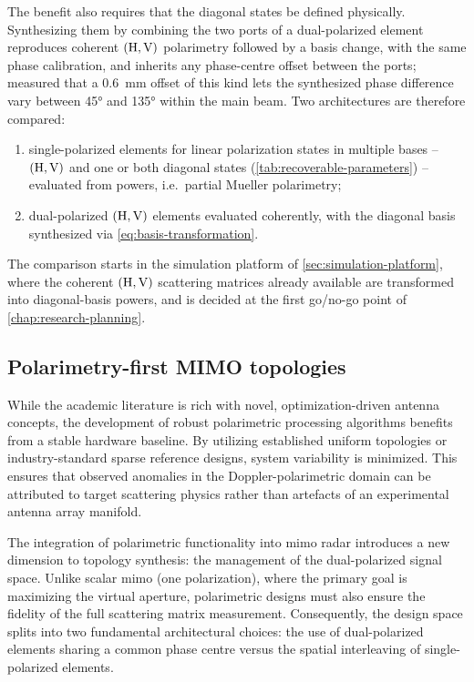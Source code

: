 The benefit also requires that the diagonal states be defined physically.
Synthesizing them by combining the two ports of a dual-polarized element reproduces coherent $(\mathrm{H}, \mathrm{V})$ polarimetry followed by a basis change, with the same phase calibration, and inherits any phase-centre offset between the ports; \textcite{hambergerMixedCircularLinear2019} measured that a \qty{0.6}{mm} offset of this kind lets the synthesized phase difference vary between \ang{45} and \ang{135} within the main beam.
Two architectures are therefore compared:
\begin{enumerate}[label=\Alph*.]
    \item single-polarized elements for linear polarization states in multiple bases -- $(\mathrm{H}, \mathrm{V})$ and one or both diagonal states (\cref{tab:recoverable-parameters}) -- evaluated from powers, i.e.\ partial Mueller polarimetry;
    \item dual-polarized $(\mathrm{H}, \mathrm{V})$ elements evaluated coherently, with the diagonal basis synthesized via \cref{eq:basis-transformation}.
\end{enumerate}
The comparison starts in the simulation platform of \cref{sec:simulation-platform}, where the coherent $(\mathrm{H}, \mathrm{V})$ scattering matrices already available are transformed into diagonal-basis powers, and is decided at the first go/no-go point of \cref{chap:research-planning}.


\subsection{Polarimetry-first MIMO topologies}
\label{sec:polarimetry-first-topologies}

While the academic literature is rich with novel, optimization-driven antenna concepts, the development of robust polarimetric processing algorithms benefits from a stable hardware baseline.
By utilizing established uniform topologies or industry-standard sparse reference designs, system variability is minimized.
This ensures that observed anomalies in the Doppler-polarimetric domain can be attributed to target scattering physics rather than artefacts of an experimental antenna array manifold.

The integration of polarimetric functionality into \gls{mimo} radar introduces a new dimension to topology synthesis: the management of the dual-polarized signal space.
Unlike scalar \gls{mimo} (one polarization), where the primary goal is maximizing the virtual aperture, polarimetric designs must also ensure the fidelity of the full scattering matrix measurement.
Consequently, the design space splits into two fundamental architectural choices: the use of dual-polarized elements sharing a common phase centre versus the spatial interleaving of single-polarized elements.

